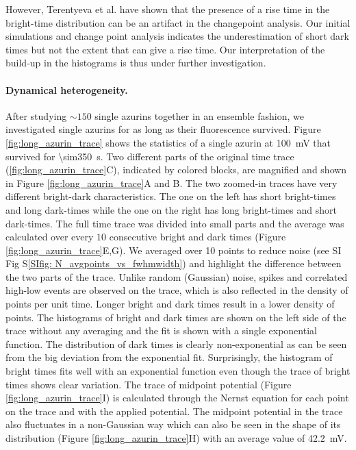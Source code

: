However, Terentyeva et al. have shown that the presence of a rise time in the bright-time distribution can be an artifact in the changepoint analysis.
Our initial simulations and change point analysis indicates the underestimation of short dark times but not the extent that can give a rise time.
Our interpretation of the build-up in the histograms is thus under further investigation.
\paragraph*{Dynamical heterogeneity.}
After studying ${\sim}150$ single azurins together in an ensemble fashion, we investigated single azurins for as long as their fluorescence survived.
Figure \ref{fig:long_azurin_trace} shows the statistics of a single azurin at \SI{100}{\mV} that survived for \SI{\sim350}{\s}.
Two different parts of the original time trace (\ref{fig:long_azurin_trace}C), indicated by colored blocks, are magnified and shown in Figure \ref{fig:long_azurin_trace}A and B.
The two zoomed-in traces have very different bright-dark characteristics.
The one on the left has short bright-times and long dark-times while the one on the right has long bright-times and short dark-times.
The full time trace was divided into small parts and the average was calculated over every $10$ consecutive bright and dark times (Figure \ref{fig:long_azurin_trace}E,G).
We averaged over 10 points to reduce noise (see SI Fig S\ref{SIfig: N_avgpoints_vs_fwhmwidth}) and highlight the difference between the two parts of the trace.
Unlike random (Gaussian) noise, spikes and correlated high-low events are observed on the trace, which is also reflected in the density of points per unit time.
Longer bright and dark times result in a lower density of points.
The histograms of bright and dark times are shown on the left side of the trace without any averaging and the fit is shown with a single exponential function.
The distribution of dark times is clearly non-exponential as can be seen from the big deviation from the exponential fit.
Surprisingly, the histogram of bright times fits well with an exponential function even though the trace of bright times shows clear variation. 
The trace of midpoint potential (Figure \ref{fig:long_azurin_trace}I) is calculated through the Nernst equation for each point on the trace and with the applied potential.
The midpoint potential in the trace also fluctuates in a non-Gaussian way which can also be seen in the shape of its distribution (Figure \ref{fig:long_azurin_trace}H) with an average value of \SI{42.2}{\mV}.
